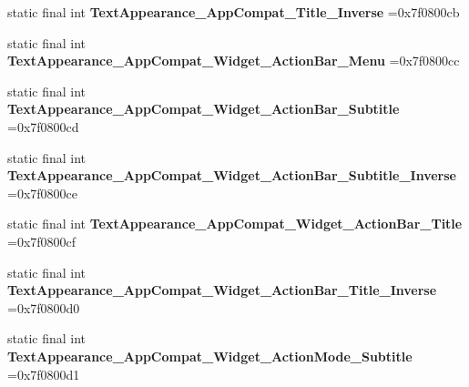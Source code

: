 \begin{DoxyCompactItemize}
\item 
\hypertarget{classcheck_1_1test_1_1_r_1_1style_a4f200282adefd86ec10b5e30e09f1f81}{}static final int {\bfseries Text\+Appearance\+\_\+\+App\+Compat\+\_\+\+Title\+\_\+\+Inverse} =0x7f0800cb\label{classcheck_1_1test_1_1_r_1_1style_a4f200282adefd86ec10b5e30e09f1f81}

\item 
\hypertarget{classcheck_1_1test_1_1_r_1_1style_af0856decc00d5d6c4c95b67c9f75c275}{}static final int {\bfseries Text\+Appearance\+\_\+\+App\+Compat\+\_\+\+Widget\+\_\+\+Action\+Bar\+\_\+\+Menu} =0x7f0800cc\label{classcheck_1_1test_1_1_r_1_1style_af0856decc00d5d6c4c95b67c9f75c275}

\item 
\hypertarget{classcheck_1_1test_1_1_r_1_1style_abdf51116918f7dbbb7f6e1954f863599}{}static final int {\bfseries Text\+Appearance\+\_\+\+App\+Compat\+\_\+\+Widget\+\_\+\+Action\+Bar\+\_\+\+Subtitle} =0x7f0800cd\label{classcheck_1_1test_1_1_r_1_1style_abdf51116918f7dbbb7f6e1954f863599}

\item 
\hypertarget{classcheck_1_1test_1_1_r_1_1style_a9f9434211754c0069fc38b16bc62aad0}{}static final int {\bfseries Text\+Appearance\+\_\+\+App\+Compat\+\_\+\+Widget\+\_\+\+Action\+Bar\+\_\+\+Subtitle\+\_\+\+Inverse} =0x7f0800ce\label{classcheck_1_1test_1_1_r_1_1style_a9f9434211754c0069fc38b16bc62aad0}

\item 
\hypertarget{classcheck_1_1test_1_1_r_1_1style_af10ffa2c45141b8f32051416a6285351}{}static final int {\bfseries Text\+Appearance\+\_\+\+App\+Compat\+\_\+\+Widget\+\_\+\+Action\+Bar\+\_\+\+Title} =0x7f0800cf\label{classcheck_1_1test_1_1_r_1_1style_af10ffa2c45141b8f32051416a6285351}

\item 
\hypertarget{classcheck_1_1test_1_1_r_1_1style_adaf58bbe522a992c6c3c4e1c5442ebc0}{}static final int {\bfseries Text\+Appearance\+\_\+\+App\+Compat\+\_\+\+Widget\+\_\+\+Action\+Bar\+\_\+\+Title\+\_\+\+Inverse} =0x7f0800d0\label{classcheck_1_1test_1_1_r_1_1style_adaf58bbe522a992c6c3c4e1c5442ebc0}

\item 
\hypertarget{classcheck_1_1test_1_1_r_1_1style_a93ae0a5f9b8c4455b898bce4469a8f4d}{}static final int {\bfseries Text\+Appearance\+\_\+\+App\+Compat\+\_\+\+Widget\+\_\+\+Action\+Mode\+\_\+\+Subtitle} =0x7f0800d1\label{classcheck_1_1test_1_1_r_1_1style_a93ae0a5f9b8c4455b898bce4469a8f4d}


\end{DoxyCompactItemize}
